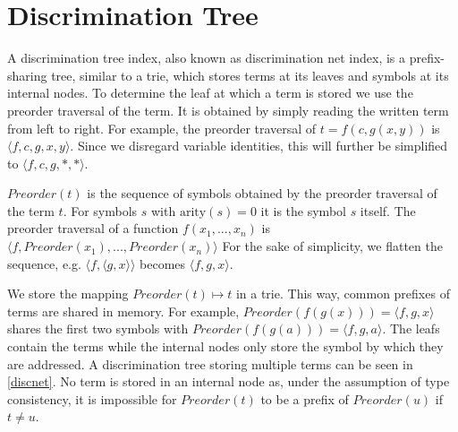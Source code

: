 \section{Discrimination Tree}
A discrimination tree index, also known as discrimination net index, is a prefix-sharing tree, similar to a trie, which stores terms at its leaves and symbols at its internal nodes. To determine the leaf at which a term is stored we use the preorder traversal of the term. It is obtained by simply reading the written term from left to right. For example, the preorder traversal of $t = f(c,g(x,y))$ is $\langle f,c,g,x,y \rangle$. Since we disregard variable identities, this will further be simplified to $\langle f,c,g,*,* \rangle$.

\begin{defn}
  $Preorder(t)$ is the sequence of symbols obtained by the preorder traversal of the term $t$. For symbols $s$ with $\mathrm{arity}(s) = 0$ it is the symbol $s$ itself. The preorder traversal of a function $f(x_{1},...,x_{n})$ is $\langle f,Preorder(x_{1}),...,Preorder(x_{n}) \rangle$ For the sake of simplicity, we flatten the sequence, e.g. $\langle f,\langle g,x \rangle \rangle$ becomes $\langle f,g,x \rangle$.
\end{defn}

We store the mapping $Preorder(t) \mapsto t$ in a trie. This way, common prefixes of terms are shared in memory. For example, $Preorder(f(g(x))) = \langle f, g, x \rangle$ shares the first two symbols with $Preorder(f(g(a))) = \langle f, g, a \rangle$. The leafs contain the terms while the internal nodes only store the symbol by which they are addressed. A discrimination tree storing multiple terms can be seen in \cref{discnet}. No term is stored in an internal node as, under the assumption of type consistency, it is impossible for $Preorder(t)$ to be a prefix of $Preorder(u)$ if $t \neq u$.


